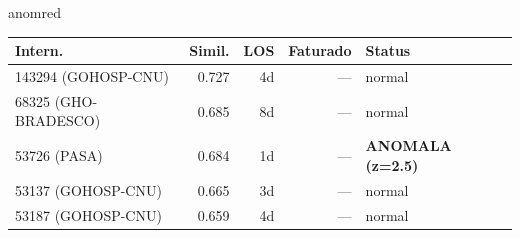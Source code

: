 \documentclass[a4paper,10pt]{article}
\begin{document}
\begin{anomalycard}[Internacao 167195 | GHO-PETROBRAS | CRITICO (z=6.11)]{anomred}
\begin{tabular}{l r r r l}\toprule\textbf{Intern.} & \textbf{Simil.} & \textbf{LOS} & \textbf{Faturado} & \textbf{Status} \\\midrule
143294 (GOHOSP-CNU) & 0.727 & 4d & --- & \textcolor{jcubeblue}{normal} \\
68325 (GHO-BRADESCO) & 0.685 & 8d & --- & \textcolor{jcubeblue}{normal} \\
53726 (PASA) & 0.684 & 1d & --- & \textcolor{anomred}{\textbf{ANOMALA (z=2.5)}} \\
53137 (GOHOSP-CNU) & 0.665 & 3d & --- & \textcolor{jcubeblue}{normal} \\
53187 (GOHOSP-CNU) & 0.659 & 4d & --- & \textcolor{jcubeblue}{normal} \\
\bottomrule\end{tabular}


\end{anomalycard}

\newpage
\end{document}
